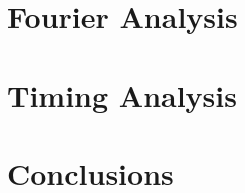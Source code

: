 \documentclass[preprint,review,12pt]{elsarticle}
\begin{document}
\section{Fourier Analysis} \label{sec::fourier}

\section{Timing Analysis} \label{sec::timing}

\section{Conclusions} \label{sec::conclusions}


\pagebreak



\end{document}
